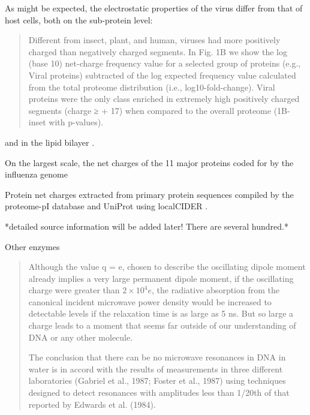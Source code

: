 \documentclass[paper.tex]{subfiles}
\begin{document}
As might be expected, the electrostatic properties of the virus differ from that of host cells, both \cite{Icosahedral2019} on the sub-protein level:

\begin{quote}
	Different from insect, plant, and human, viruses had more positively charged than negatively charged segments. In Fig. 1B we show the log (base 10) net-charge frequency value for a selected group of proteins (e.g., Viral proteins) subtracted of the log expected frequency value calculated from the total proteome distribution (i.e., log10-fold-change). Viral proteins were the only class enriched in extremely high positively charged segments (charge ≥ + 17) when compared to the overall proteome (1B-inset with p-values).
\end{quote}

and in the lipid bilayer \cite{Lipid2015} \footnotemark.


On the largest scale, the net charges of the 11 major proteins coded for by the influenza genome 



Protein net charges extracted from primary protein sequences compiled by the proteome-pI database \cite{ProteomepI2017} and UniProt using localCIDER \cite{CIDER2017} . 

*detailed source information will be added later! There are several hundred.*



Other enzymes

\cite{Vibrational2002}
\begin{quote}
Although the value q = e, chosen to describe the oscillating dipole moment already implies a very large permanent dipole moment, if the oscillating charge were greater
than $2\times 10^4 e$, the radiative absorption from the canonical
incident microwave power density would be increased to
detectable levels if the relaxation time is as large as 5 ns.
But so large a charge leads to a moment that seems far
outside of our understanding of DNA or any other molecule.


The conclusion that there can be no microwave resonances in DNA in water is in accord with the results of
measurements in three different laboratories (Gabriel et al.,
1987; Foster et al., 1987) using techniques designed to
detect resonances with amplitudes less than 1/20th of that
reported by Edwards et al. (1984).
\end{quote}
\end{document}

